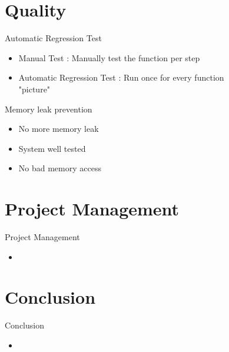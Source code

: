 \documentclass{beamer}
\begin{document}
\section{Quality}
\begin{frame}{Automatic Regression Test}
  \begin{itemize}
    \item Manual Test : Manually test the function per step
    \item Automatic Regression Test : Run once for every function
    \\"picture"
  \end{itemize}
\end{frame}

\begin{frame}{Memory leak prevention}
  \begin{itemize}
    \item No more memory leak
    \item System well tested
    \item No bad memory access
  \end{itemize}
\end{frame}

\section{Project Management}
\begin{frame}{Project Management}
\begin{itemize}
  \item 
  \end{itemize}
\end{frame}

\section{Conclusion}
\begin{frame}{Conclusion}
\begin{itemize}
  \item 
  \end{itemize}
\end{frame}
\end{document}
